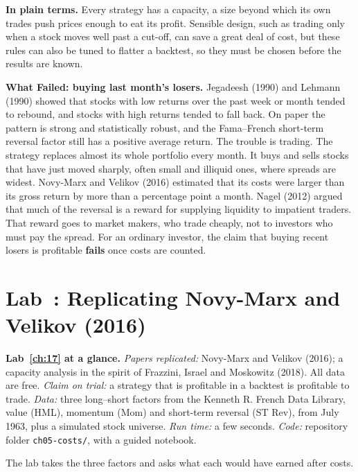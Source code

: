 \noindent\textbf{In plain terms.} Every strategy has a capacity, a size beyond which its own trades push prices enough to eat its profit. Sensible design, such as trading only when a stock moves well past a cut-off, can save a great deal of cost, but these rules can also be tuned to flatter a backtest, so they must be chosen before the results are known.

\begin{callout}
\textbf{What Failed: buying last month's losers.} Jegadeesh (1990) and Lehmann (1990) showed that stocks with low returns over the past week or month tended to rebound, and stocks with high returns tended to fall back. On paper the pattern is strong and statistically robust, and the Fama--French short-term reversal factor still has a positive average return. The trouble is trading. The strategy replaces almost its whole portfolio every month. It buys and sells stocks that have just moved sharply, often small and illiquid ones, where spreads are widest. Novy-Marx and Velikov (2016) estimated that its costs were larger than its gross return by more than a percentage point a month. Nagel (2012) argued that much of the reversal is a reward for supplying liquidity to impatient traders. That reward goes to market makers, who trade cheaply, not to investors who must pay the spread. For an ordinary investor, the claim that buying recent losers is profitable \textbf{fails} once costs are counted.
\end{callout}

\section{Lab~\thechapter: Replicating Novy-Marx and Velikov (2016)}
\label{sec:17-lab}

\begin{callout}
\textbf{Lab~\ref{ch:17} at a glance.} \emph{Papers replicated:} Novy-Marx and Velikov (2016); a capacity analysis in the spirit of Frazzini, Israel and Moskowitz (2018). All data are free. \emph{Claim on trial:} a strategy that is profitable in a backtest is profitable to trade. \emph{Data:} three long--short factors from the Kenneth R. French Data Library, value (HML), momentum (Mom) and short-term reversal (ST Rev), from July 1963, plus a simulated stock universe. \emph{Run time:} a few seconds. \emph{Code:} repository folder \texttt{ch05-costs/}, with a guided notebook.
\end{callout}

The lab takes the three factors and asks what each would have earned after costs.

